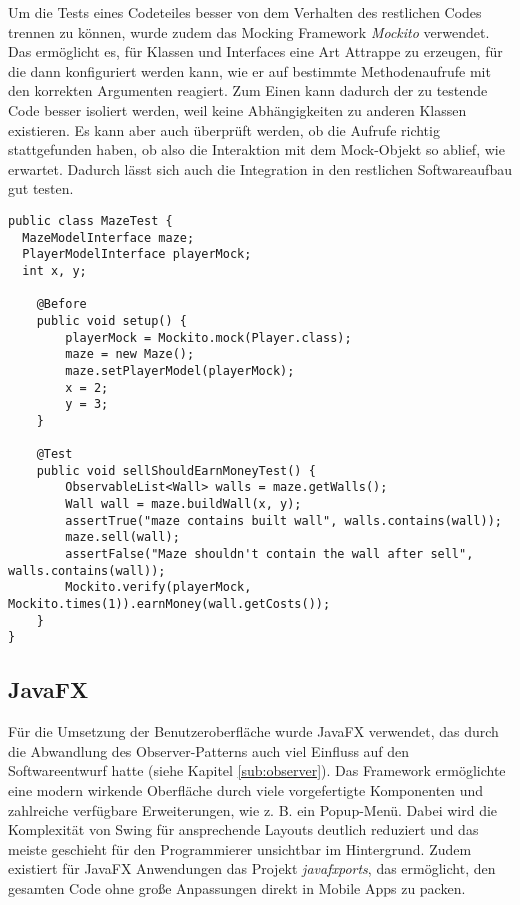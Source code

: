 Um die Tests eines Codeteiles besser von dem Verhalten des restlichen Codes trennen zu können, wurde zudem das Mocking Framework \emph{Mockito} verwendet. Das ermöglicht es, für Klassen und Interfaces eine Art Attrappe zu erzeugen, für die dann konfiguriert werden kann, wie er auf bestimmte Methodenaufrufe mit den korrekten Argumenten reagiert. Zum Einen kann dadurch der zu testende Code besser isoliert werden, weil keine Abhängigkeiten zu anderen Klassen existieren. Es kann aber auch überprüft werden, ob die Aufrufe richtig stattgefunden haben, ob also die Interaktion mit dem Mock-Objekt so ablief, wie erwartet. Dadurch lässt sich auch die Integration in den restlichen Softwareaufbau gut testen.
\begin{lstlisting}[caption={Testbeispiel mit Mockito. Das Maze verwendet ein Mock Objekt von \class{PlayerModelInterface} (Zeile 8) und testet, ob das Verkaufen einer Mauer die Mauer wirklich entfernt (Zeile 21) und dem Spieler den richtigen Geldwert gibt (Zeile 22).},captionpos=b]
public class MazeTest {
  MazeModelInterface maze;
  PlayerModelInterface playerMock;
  int x, y;

	@Before
	public void setup() {
		playerMock = Mockito.mock(Player.class);
		maze = new Maze();
		maze.setPlayerModel(playerMock);
		x = 2;
		y = 3;
	}

	@Test
	public void sellShouldEarnMoneyTest() {
		ObservableList<Wall> walls = maze.getWalls();
		Wall wall = maze.buildWall(x, y);
		assertTrue("maze contains built wall", walls.contains(wall));
		maze.sell(wall);
		assertFalse("Maze shouldn't contain the wall after sell", walls.contains(wall));
		Mockito.verify(playerMock, Mockito.times(1)).earnMoney(wall.getCosts());
	}
}
\end{lstlisting}


\subsection{JavaFX} %
\label{sub:javafx}
Für die Umsetzung der Benutzeroberfläche wurde JavaFX verwendet, das durch die Abwandlung des Observer-Patterns auch viel Einfluss auf den Softwareentwurf hatte (siehe Kapitel \ref{sub:observer}). Das Framework ermöglichte eine modern wirkende Oberfläche durch viele vorgefertigte Komponenten und zahlreiche verfügbare Erweiterungen, wie z. B. ein Popup-Menü. Dabei wird die Komplexität von Swing für ansprechende Layouts deutlich reduziert und das meiste geschieht für den Programmierer unsichtbar im Hintergrund. Zudem existiert für JavaFX Anwendungen das Projekt \emph{javafxports}, das ermöglicht, den gesamten Code ohne große Anpassungen direkt in Mobile Apps zu packen.

